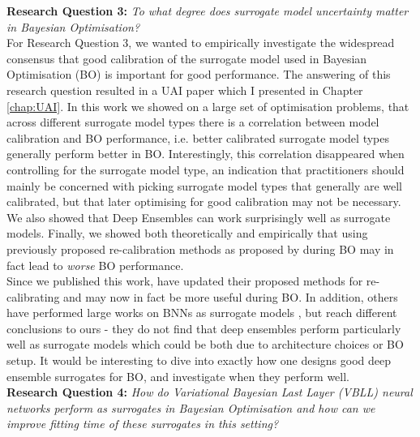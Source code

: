 \noindent \textbf{Research Question 3:} \textit{To what degree does surrogate model uncertainty matter in Bayesian Optimisation?}\\

\noindent For Research Question 3, we wanted to empirically investigate the widespread consensus that good calibration of the surrogate model used in Bayesian Optimisation (BO) is important for good performance. The answering of this research question resulted in a UAI paper which I presented in Chapter \ref{chap:UAI}. In this work we showed on a large set of optimisation problems, that across different surrogate model types there is a correlation between model calibration and BO performance, i.e. better calibrated surrogate model types generally perform better in BO. Interestingly, this correlation disappeared when controlling for the surrogate model type, an indication that practitioners should mainly be concerned with picking surrogate model types that generally are well calibrated, but that later optimising for good calibration may not be necessary. We also showed that Deep Ensembles can work surprisingly well as surrogate models. Finally, we showed both theoretically and empirically that using previously proposed re-calibration methods as proposed by \citet{recalibration_BO} during BO may in fact lead to \textit{worse} BO performance. \\

\noindent Since we published this work, \cite{recalibration_BO} have updated their proposed methods for re-calibrating and may now in fact be more useful during BO. In addition, others have performed large works on BNNs as surrogate models \citep{li2024a}, but reach different conclusions to ours - they do not find that deep ensembles perform particularly well as surrogate models which could be both due to architecture choices or BO setup. It would be interesting to dive into exactly how one designs good deep ensemble surrogates for BO, and investigate when they perform well. \\


 \noindent \textbf{Research Question 4:} \textit{How do Variational Bayesian Last Layer (VBLL) neural networks perform as surrogates in Bayesian Optimisation and how can we improve fitting time of these surrogates in this setting?} \\


